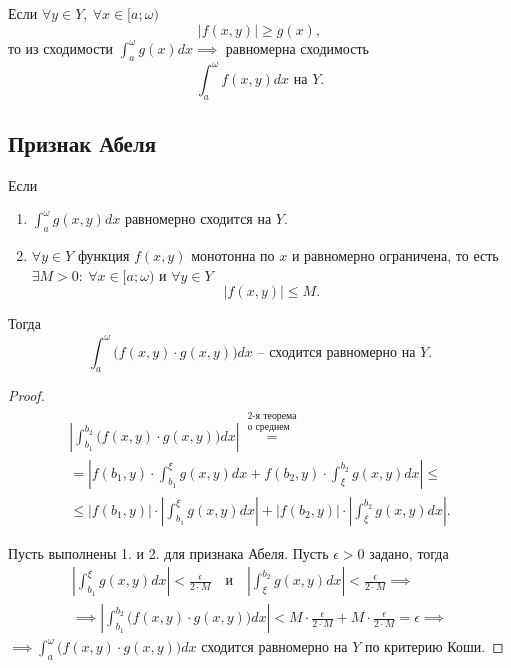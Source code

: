 \begin{corollary}
    Если $\forall y \in Y, \ \forall x \in [a;\omega)$
    \[
        \big|f(x,y)\big| \geqslant g(x),
    \]
    то из сходимости $\int_{a}^{\omega}g(x)dx \implies$ равномерна сходимость
    \[
        \int_{a}^{\omega}f(x,y)dx \text{ на }Y.
    \]
\end{corollary}

\subsection{Признак Абеля}

\begin{theorem}
    Если \begin{enumerate}
        \item $\int_{a}^{\omega}g(x,y)dx$ равномерно сходится на $Y$.
        \item $\forall y \in Y$ функция $f(x,y)$ монотонна по $x$ и равномерно ограничена, то есть $\exists M > 0: \ \forall x \in [a;\omega)$ и $\forall y \in Y$
              \[
                  \left|f(x,y)\right| \leqslant M.
              \]
    \end{enumerate}

    Тогда
    \[
        \int_{a}^{\omega}\big(f(x,y) \cdot g(x,y)\big)dx \text{ -- сходится равномерно на }Y.
    \]
\end{theorem}

\begin{proof}
    \begin{multline*}
        \left|\int_{b_1}^{b_2}\big(f(x,y)\cdot g(x,y)\big)dx\right| \overset{\begin{array}{c}
                \text{2-я теорема} \\
                \text{о среднем}
            \end{array}}{=} \\
        = \left|f(b_1,y)\cdot \int_{b_1}^{\xi}g(x,y)dx + f(b_2,y)\cdot \int_{\xi}^{b_2}g(x,y)dx\right| \leqslant \\
        \leqslant \left|f(b_1,y)\right| \cdot \left|\int_{b_1}^{\xi}g(x,y)dx\right| + \left|f(b_2,y)\right| \cdot \left|\int_{\xi}^{b_2}g(x,y)dx\right|.
    \end{multline*}

    Пусть выполнены 1. и 2. для признака Абеля. Пусть $\epsilon > 0$ задано, тогда
    \begin{multline*}
        \left|\int_{b_1}^{\xi}g(x,y)dx\right| < \frac{\epsilon}{2\cdot M} \quad\text{и}\quad \left|\int_{\xi}^{b_2}g(x,y)dx\right| < \frac{\epsilon}{2 \cdot M} \implies \\
        \implies \left|\int_{b_1}^{b_2}\big(f(x,y)\cdot g(x,y)\big)dx \right| < M \cdot \frac{\epsilon}{2 \cdot M} + M \cdot \frac{\epsilon}{2 \cdot M} = \epsilon \implies
    \end{multline*}
    $\implies \int_{a}^{\omega}\big(f(x,y)\cdot g(x,y)\big)dx$ сходится равномерно на $Y$ по критерию Коши.
\end{proof}

